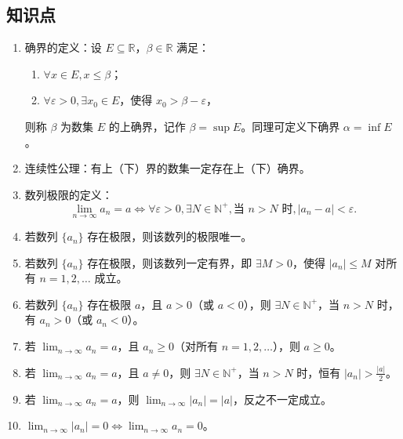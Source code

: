 \documentclass[UTF8]{ctexart}
\theoremstyle{remark}
\begin{document}
		\subsection*{知识点}
		
		\begin{enumerate}
			\item 确界的定义：设 $ E \subseteq \mathbb{R} $，$ \beta \in \mathbb{R} $ 满足：
			\begin{enumerate}
				\item $ \forall x \in E, x \leq \beta $；
				\item $ \forall \varepsilon > 0, \exists x_0 \in E $，使得 $ x_0 > \beta - \varepsilon $，
			\end{enumerate}
			则称 $ \beta $ 为数集 $ E $ 的上确界，记作 $ \beta = \sup E $。同理可定义下确界 $ \alpha = \inf E $。
			
			\item 连续性公理：有上（下）界的数集一定存在上（下）确界。
			
			\item 数列极限的定义：$$
			\lim_{n \to \infty} a_n = a \iff \forall \varepsilon > 0, \exists N \in \mathbb{N}^+, \text{当 } n > N \text{ 时}, |a_n - a| < \varepsilon.
			$$
			
			\item 若数列 $ \{a_n\} $ 存在极限，则该数列的极限唯一。
			
			\item 若数列 $ \{a_n\} $ 存在极限，则该数列一定有界，即 $ \exists M > 0 $，使得 $ |a_n| \leq M $ 对所有 $ n = 1, 2, \dots $ 成立。
			
			\item 若数列 $ \{a_n\} $ 存在极限 $ a $，且 $ a > 0 $（或 $ a < 0 $），则 $ \exists N \in \mathbb{N}^+ $，当 $ n > N $ 时，有 $ a_n > 0 $（或 $ a_n < 0 $）。
			
			\item 若 $ \lim_{n \to \infty} a_n = a $，且 $ a_n \geq 0 $（对所有 $ n = 1, 2, \dots $），则 $ a \geq 0 $。
			
			\item 若 $ \lim_{n \to \infty} a_n = a $，且 $ a \ne 0 $，则 $ \exists N \in \mathbb{N}^+ $，当 $ n > N $ 时，恒有 $ |a_n| > \frac{|a|}{2} $。
			
			\item 若 $ \lim_{n \to \infty} a_n = a $，则 $ \lim_{n \to \infty} |a_n| = |a| $，反之不一定成立。
			
			\item $ \lim_{n \to \infty} |a_n| = 0 \iff \lim_{n \to \infty} a_n = 0 $。
			

\end{enumerate}
\end{document}
